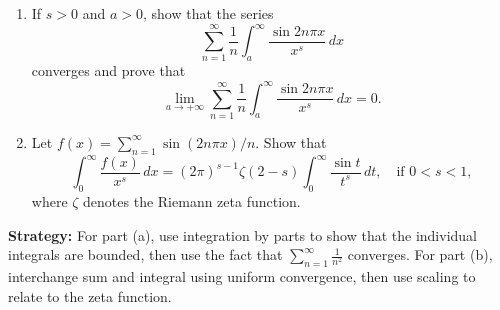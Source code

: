 \begin{problembox}
\begin{problemstatement}
\begin{enumerate}[label=(\alph*)]
\item If $s > 0$ and $a > 0$, show that the series
\[\sum_{n=1}^{\infty} \frac{1}{n} \int_{a}^{\infty} \frac{\sin 2n\pi x}{x^{s}} \, dx\]
converges and prove that
\[\lim_{a \to +\infty} \sum_{n=1}^{\infty} \frac{1}{n} \int_{a}^{\infty} \frac{\sin 2n\pi x}{x^{s}} \, dx = 0.\]
\item Let $f(x) = \sum_{n=1}^{\infty} \sin (2n\pi x)/n$. Show that
\[\int_{0}^{\infty} \frac{f(x)}{x^{s}} \, dx = (2\pi)^{s-1} \zeta (2 - s) \int_{0}^{\infty} \frac{\sin t}{t^{s}} \, dt, \quad \text{if } 0 < s < 1,\]
where $\zeta$ denotes the Riemann zeta function.
\end{enumerate}
\end{problemstatement}
\end{problembox}

\noindent\textbf{Strategy:} For part (a), use integration by parts to show that the individual integrals are bounded, then use the fact that $\sum_{n=1}^{\infty} \frac{1}{n^2}$ converges. For part (b), interchange sum and integral using uniform convergence, then use scaling to relate to the zeta function.

